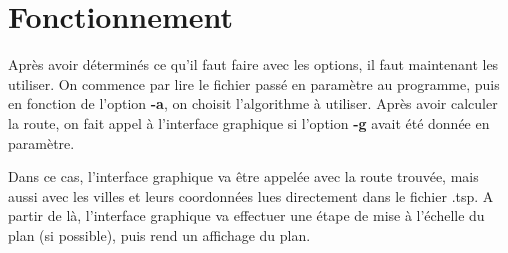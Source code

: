 \section{Fonctionnement}

Après avoir déterminés ce qu'il faut faire avec les options, il faut maintenant les utiliser. On commence par lire le fichier passé en paramètre au programme, puis en fonction de l'option \textbf{-a}, on choisit l'algorithme à utiliser. Après avoir calculer la route, on fait appel à l'interface graphique si l'option \textbf{-g} avait été donnée en paramètre.

Dans ce cas, l'interface graphique va être appelée avec la route trouvée, mais aussi avec les villes et leurs coordonnées lues directement dans le fichier .tsp. A partir de là, l'interface graphique va effectuer une étape de mise à l'échelle du plan (si possible), puis rend un affichage du plan.